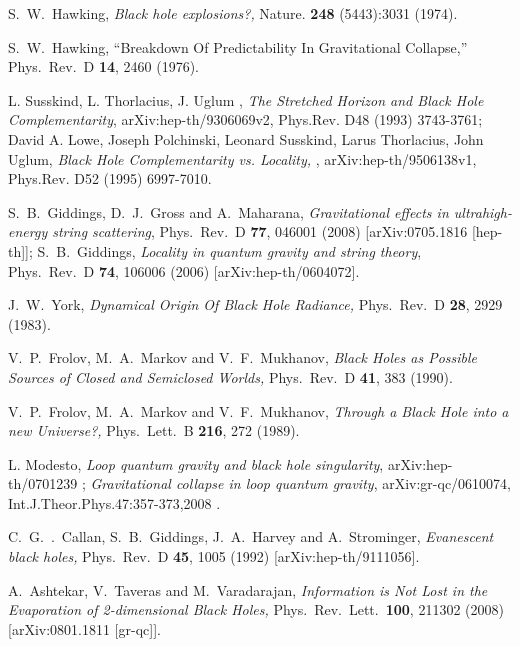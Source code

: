 \documentclass[12pt]{article}
\begin{document}
\begin{thebibliography}{99}
 
 S.~W.~Hawking, 
 {\it Black hole explosions?,}
 Nature. {\bf 248} (5443):3031 (1974).
 
S.~W.~Hawking, 
``Breakdown Of Predictability In Gravitational Collapse,'' Phys.\ Rev.\ D {\bf 14}, 2460 (1976). %

L. Susskind, L. Thorlacius, J. Uglum ,
 {\it The Stretched Horizon and Black Hole Complementarity}, arXiv:hep-th/9306069v2, 
	Phys.Rev. D48 (1993) 3743-3761; David A. Lowe, Joseph Polchinski, Leonard Susskind, Larus Thorlacius, John Uglum, 
 {\it Black Hole Complementarity vs. Locality, }, arXiv:hep-th/9506138v1, Phys.Rev. D52 (1995) 6997-7010. 
 
 S.~B.~Giddings, D.~J.~Gross and A.~Maharana, {\it Gravitational effects in ultrahigh-energy string scattering}, Phys.\ Rev.\ D {\bf 77}, 046001 (2008) [arXiv:0705.1816 [hep-th]];  S.~B.~Giddings, {\it Locality in quantum gravity and string theory}, Phys.\ Rev.\ D {\bf 74}, 106006 (2006) [arXiv:hep-th/0604072]. 


J.~W.~York, {\it Dynamical Origin Of Black Hole Radiance,} 
Phys.\ Rev.\ D {\bf 28}, 2929 (1983). 

  V.~P.~Frolov, M.~A.~Markov and V.~F.~Mukhanov, 
{\it Black Holes as Possible Sources of Closed and Semiclosed Worlds,}
Phys.\ Rev.\ D {\bf 41}, 383 (1990). %

V.~P.~Frolov, M.~A.~Markov and V.~F.~Mukhanov, 
{\it Through a Black Hole into a new Universe?,}
 Phys.\ Lett.\ B {\bf 216}, 272 (1989). %

L.  Modesto, {\it  Loop quantum gravity and black hole singularity},  arXiv:hep-th/0701239 ;  
{\it Gravitational collapse in loop quantum gravity}, arXiv:gr-qc/0610074, Int.J.Theor.Phys.47:357-373,2008 .  

C.~G.~.~Callan, S.~B.~Giddings, J.~A.~Harvey and A.~Strominger, 
{\it Evanescent black holes,} 
Phys.\ Rev.\ D {\bf 45}, 1005 (1992) [arXiv:hep-th/9111056]. %

A.~Ashtekar, V.~Taveras and M.~Varadarajan, 
{\it Information is Not Lost in the Evaporation of 2-dimensional Black Holes,} 
Phys.\ Rev.\ Lett.\ {\bf 100}, 211302 (2008) [arXiv:0801.1811 [gr-qc]]. 


\end{thebibliography}
\end{document}
